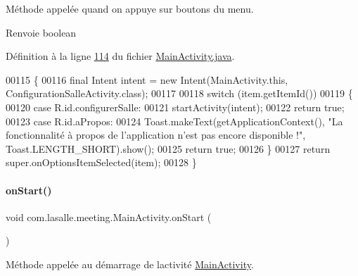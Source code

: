 Méthode appelée quand on appuye sur boutons du menu. 

\begin{DoxyReturn}{Renvoie}
boolean 
\end{DoxyReturn}


Définition à la ligne \hyperlink{_main_activity_8java_source_l00114}{114} du fichier \hyperlink{_main_activity_8java_source}{Main\+Activity.\+java}.


\begin{DoxyCode}
00115     \{
00116         \textcolor{keyword}{final} Intent intent = \textcolor{keyword}{new} Intent(MainActivity.this, ConfigurationSalleActivity.class);
00117 
00118         \textcolor{keywordflow}{switch} (item.getItemId())
00119         \{
00120             \textcolor{keywordflow}{case} R.id.configurerSalle:
00121                 startActivity(intent);
00122                 \textcolor{keywordflow}{return} \textcolor{keyword}{true};
00123             \textcolor{keywordflow}{case} R.id.aPropos:
00124                 Toast.makeText(getApplicationContext(), \textcolor{stringliteral}{"La fonctionnalité à propos de l'application n'est
       pas encore disponible !"}, Toast.LENGTH\_SHORT).show();
00125                 \textcolor{keywordflow}{return} \textcolor{keyword}{true};
00126         \}
00127         \textcolor{keywordflow}{return} super.onOptionsItemSelected(item);
00128     \}
\end{DoxyCode}
\mbox{\label{classcom_1_1lasalle_1_1meeting_1_1_main_activity_a09159617fa8f6a5d7b663ba2cf3d65c4}} 
\paragraph{\texorpdfstring{on\+Start()}{onStart()}}
{\footnotesize\ttfamily void com.\+lasalle.\+meeting.\+Main\+Activity.\+on\+Start (\begin{DoxyParamCaption}{ }\end{DoxyParamCaption})\hspace{0.3cm}{\ttfamily [protected]}}



Méthode appelée au démarrage de l\textquotesingle{}activité \hyperlink{classcom_1_1lasalle_1_1meeting_1_1_main_activity}{Main\+Activity}. 

